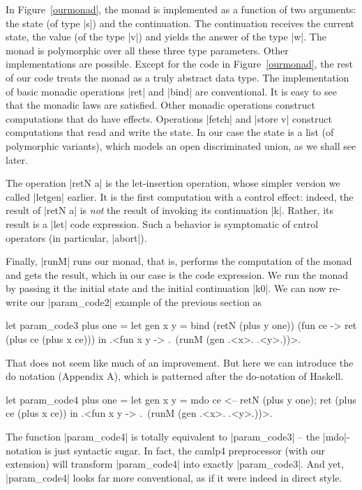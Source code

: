 \documentclass{llncs}
\begin{document}
In Figure~\ref{ourmonad}, the monad is implemented as a function of two
arguments: the state (of type |s|) and the continuation. The
continuation receives the current state, the value (of the type |v|) and
yields the answer of the type |w|.  The monad is polymorphic over all
these three type parameters.  Other implementations are
possible. Except for the code in Figure~\ref{ourmonad}, the rest of our code
treats the monad as a truly abstract data type. The implementation of basic
monadic operations |ret| and |bind| are conventional. It is easy to
see that the monadic laws are satisfied.  Other monadic operations
construct computations that do have effects.  Operations |fetch| and
|store v| construct computations that read and write the state. In our
case the state is a list (of polymorphic variants), which models an
open discriminated union, as we shall see later.

The operation |retN a| is the let-insertion operation, whose simpler
version we called |letgen| earlier. It is the first computation with
a control effect: indeed, the result of |retN a| is \emph{not} the
result of invoking its continuation |k|. Rather, its result is a |let|
code expression. Such a behavior is symptomatic of cntrol operators
(in particular, |abort|).

Finally, |runM| runs our monad, that is, performs the computation of
the monad and gets the result, which in our case is the code
expression. We run the monad by passing it the initial state and the
initial continuation |k0|. We can now re-write our |param_code2|
example of the previous section as

\begin{code}
let param_code3 plus one =
  let gen x y = bind (retN (plus y one)) (fun ce -> 
                ret (plus ce (plus x ce)))
  in .<fun x y -> .~(runM (gen .<x>. .<y>.))>.
\end{code}

That does not seem like much of an improvement. But here we can introduce the
do notation (Appendix A), which is patterned after the do-notation of Haskell.

\begin{code}
let param_code4 plus one =
  let gen x y = mdo { ce <-- retN (plus y one);
                      ret (plus ce (plus x ce)) }
  in .<fun x y -> .~(runM (gen .<x>. .<y>.))>.
\end{code}

The function |param_code4| is totally equivalent to |param_code3| --
the |mdo|-notation is just syntactic sugar. In fact, the camlp4
preprocessor (with our extension) will transform |param_code4|
into exactly |param_code3|. And yet, |param_code4| looks far more
conventional, as if it were indeed in direct style.
\end{document}
